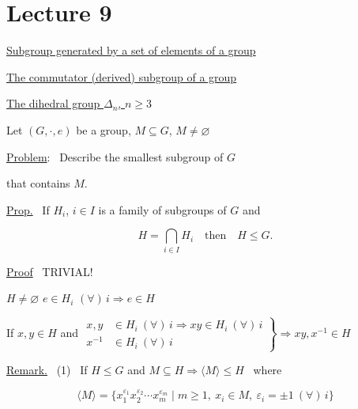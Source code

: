\bigskip

\section{Lecture 9}

\begin{center}
\end{center}
\begin{flushright}
\end{flushright}

\bigskip
\noindent\underline{Subgroup generated by a set of elements of a group}

\noindent\underline{The commutator (derived) subgroup of a group}

\noindent\underline{The dihedral group $\Delta_n$, $n\geq 3$}

\bigskip
\bigskip
\noindent Let $(G,\cdot,e)$ be a group, $M\subseteq G$, $M\neq\varnothing$

\noindent\underline{Problem}: \ Describe the smallest subgroup of $G$

\noindent that contains $M$.

\bigskip
\noindent\underline{Prop.} \ If $H_i$, $i\in I$ is a family of subgroups of $G$ and

\[
H=\bigcap_{i\in I} H_i \quad \text{then} \quad H\leq G.
\]

\bigskip
\noindent\underline{Proof} \ TRIVIAL!

\noindent $H\neq\varnothing$ \quad $e\in H_i$ $(\forall)\,i \Rightarrow e\in H$

\noindent If $x,y\in H$ and $\left.\begin{aligned}x,y&\in H_i\ (\forall)\,i \Rightarrow xy\in H_i\ (\forall)\,i\\ x^{-1}&\in H_i\ (\forall)\,i\end{aligned}\right\} \Rightarrow xy,x^{-1}\in H$

\bigskip
\noindent\underline{Remark.} \ (1) \ If $H\leq G$ and $M\subseteq H \Rightarrow \langle M\rangle \leq H$ \ where

\[
\langle M\rangle = \{x_1^{\varepsilon_1}x_2^{\varepsilon_2}\cdots x_m^{\varepsilon_m} \mid m\geq 1,\ x_i\in M,\ \varepsilon_i=\pm 1\ (\forall)\,i\}
\]

